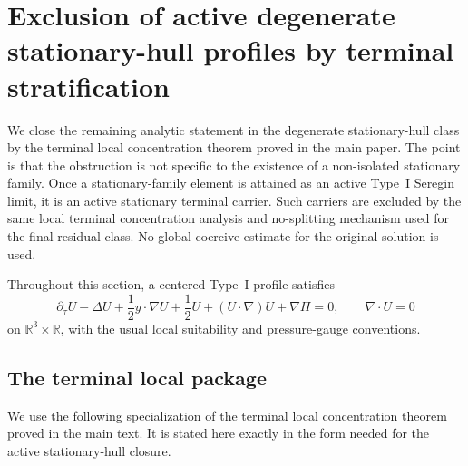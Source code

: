
\section{Exclusion of active degenerate stationary-hull profiles by terminal stratification}
\label{sec:R3-terminal-stratification-closure}

We close the remaining analytic statement in the degenerate stationary-hull
class by the terminal local concentration theorem proved in the main
paper.  The point is that the obstruction is not specific to the existence of a
non-isolated stationary family.  Once a stationary-family element is attained as
an active Type~I Seregin limit, it is an active stationary terminal carrier.
Such carriers are excluded by the same local terminal concentration analysis and
no-splitting mechanism used for the final residual class.  No global coercive
estimate for the original solution is used.

Throughout this section, a centered Type~I profile satisfies
\begin{equation}\label{eq:R3S-centered}
   \partial_\tau U-\Delta U+\frac12 y\cdot\nabla U+\frac12 U
   +(U\cdot\nabla)U+\nabla \Pi=0,
   \qquad \nabla\cdot U=0
\end{equation}
on \(\mathbb R^3\times\mathbb R\), with the usual local suitability and
pressure-gauge conventions.

\subsection{The terminal local package}

We use the following specialization of the terminal local concentration theorem
proved in the main text.  It is stated here exactly in the form needed for the
active stationary-hull closure.

